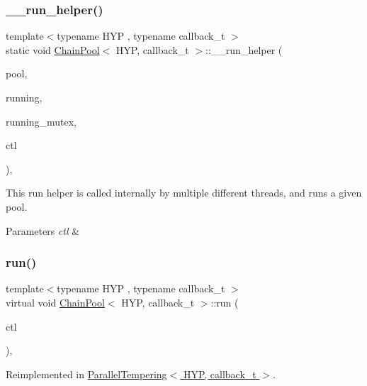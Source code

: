\subsubsection{\texorpdfstring{\+\_\+\+\_\+run\+\_\+helper()}{\_\_run\_helper()}}
{\footnotesize\ttfamily template$<$typename H\+YP , typename callback\+\_\+t $>$ \\
static void \hyperlink{class_chain_pool}{Chain\+Pool}$<$ H\+YP, callback\+\_\+t $>$\+::\+\_\+\+\_\+run\+\_\+helper (\begin{DoxyParamCaption}\item[{std\+::vector$<$ \hyperlink{class_m_c_m_c_chain}{M\+C\+M\+C\+Chain}$<$ H\+YP, callback\+\_\+t $>$$>$ $\ast$}]{pool,  }\item[{std\+::vector$<$ bool $>$ $\ast$}]{running,  }\item[{std\+::mutex $\ast$}]{running\+\_\+mutex,  }\item[{\hyperlink{struct_control}{Control}}]{ctl }\end{DoxyParamCaption})\hspace{0.3cm}{\ttfamily [inline]}, {\ttfamily [static]}}

This run helper is called internally by multiple different threads, and runs a given pool. 
\begin{DoxyParams}{Parameters}
{\em ctl} & \\
\hline
\end{DoxyParams}
\mbox{\label{class_chain_pool_af5f0e391f9794ff89f29296c8b41bf8e}} 
\subsubsection{\texorpdfstring{run()}{run()}}
{\footnotesize\ttfamily template$<$typename H\+YP , typename callback\+\_\+t $>$ \\
virtual void \hyperlink{class_chain_pool}{Chain\+Pool}$<$ H\+YP, callback\+\_\+t $>$\+::run (\begin{DoxyParamCaption}\item[{\hyperlink{struct_control}{Control}}]{ctl }\end{DoxyParamCaption})\hspace{0.3cm}{\ttfamily [inline]}, {\ttfamily [virtual]}}



Reimplemented in \hyperlink{class_parallel_tempering_a6824837893cf52eb1cac362e78e483b9}{Parallel\+Tempering$<$ H\+Y\+P, callback\+\_\+t $>$}.



